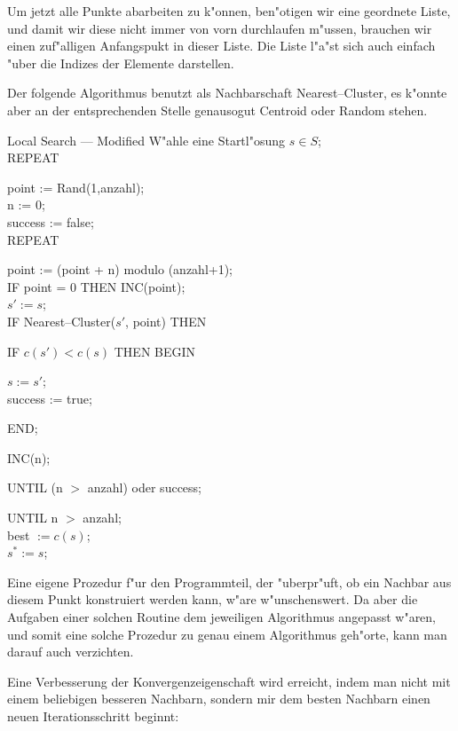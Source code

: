 Um jetzt alle Punkte abarbeiten zu k"onnen, ben"otigen wir eine
geordnete Liste, und damit wir diese nicht immer von vorn durchlaufen
m"ussen, brauchen wir einen zuf"alligen Anfangspukt in dieser Liste.
Die Liste l"a"st sich auch einfach "uber die Indizes der Elemente
darstellen.

Der folgende Algorithmus benutzt als Nachbarschaft
Nea\-rest--Cluster, es k"onn\-te aber an der entsprechenden
Stelle genausogut Cent\-roid oder Ran\-dom stehen.

\begin{algorithm}{Local Search --- Modified}
\label{localopt}
\label{listenalgo}
W"ahle eine Startl"osung $s \in S$;\\
REPEAT
\begin{Block}
	point := Rand(1,anzahl);\\
	n := 0;\\
	success := false;\\
	REPEAT
	\begin{Block}
		point := (point + n) modulo (anzahl+1);\\
		IF point = 0 THEN INC(point);\\
		$s' := s$;\\
		IF Nearest--Cluster($s'$, point) THEN
		\begin{Block}
			IF $c(s') < c(s)$ THEN BEGIN
			\begin{Block}
				$s := s'$;\\
				success := true;
			\end{Block}
			END;
		\end{Block}
		INC(n);
	\end{Block}
	UNTIL (n $>$ anzahl) oder success;
\end{Block}
UNTIL n $>$ anzahl;\\
best $ := c(s)$;\\
$s^\ast := s$;
\end{algorithm}

Eine eigene Prozedur f"ur den Programmteil, der "uberpr"uft, ob ein 
Nachbar aus diesem Punkt konstruiert werden kann, w"are w"unschenswert.
Da aber die Aufgaben einer solchen Routine dem jeweiligen Algorithmus
angepasst w"aren, und somit eine solche Prozedur zu genau einem 
Algorithmus geh"orte, kann man darauf auch verzichten.

Eine Verbesserung der Konvergenzeigenschaft wird erreicht, indem man  nicht
mit einem beliebigen besseren Nachbarn, sondern mir dem besten Nachbarn
einen neuen Iterationsschritt beginnt:

